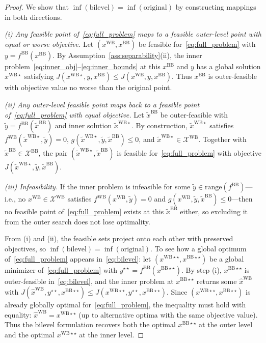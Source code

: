 \documentclass[12pt,a4paper]{article}%
\theoremstyle{plain}%
\theoremstyle{remark}%
\theoremstyle{definition}%
\def\WB{\mathrm{WB}}
\def\BB{\mathrm{BB}}
\begin{document}
\begin{appendices}
\begin{proof}
We show that $\inf(\text{bilevel}) = \inf(\text{original})$ by constructing mappings in both directions.

\emph{(i) Any feasible point of~\eqref{eq:full_problem} maps to a feasible outer-level point with equal or worse objective.}
Let $(x^{\WB}, x^{\BB})$ be feasible for~\eqref{eq:full_problem} with $y = f^{\BB}(x^{\BB})$. By Assumption~\ref{ass:separability}(ii), the inner problem~\eqref{eq:inner_obj}--\eqref{eq:inner_bounds} at this $x^{\BB}$ and $y$ has a global solution $x^{\WB\star}$ satisfying $J(x^{\WB\star}, y, x^{\BB}) \leq J(x^{\WB}, y, x^{\BB})$. Thus $x^{\BB}$ is outer-feasible with objective value no worse than the original point.

\emph{(ii) Any outer-level feasible point maps back to a feasible point of~\eqref{eq:full_problem} with equal objective.}
Let $\tilde{x}^{\BB}$ be outer-feasible with $\tilde{y} = f^{\BB}(\tilde{x}^{\BB})$ and inner solution $\tilde{x}^{\WB\star}$. By construction, $\tilde{x}^{\WB\star}$ satisfies $f^{\WB}(\tilde{x}^{\WB\star}, \tilde{y}) = 0$, $g(\tilde{x}^{\WB\star}, \tilde{y}, \tilde{x}^{\BB}) \leq 0$, and $\tilde{x}^{\WB\star} \in \mathcal{X}^{\WB}$. Together with $\tilde{x}^{\BB} \in \mathcal{X}^{\BB}$, the pair $(\tilde{x}^{\WB\star}, \tilde{x}^{\BB})$ is feasible for~\eqref{eq:full_problem} with objective $J(\tilde{x}^{\WB\star}, \tilde{y}, \tilde{x}^{\BB})$.

\emph{(iii) Infeasibility.}
If the inner problem is infeasible for some $\tilde{y} \in \text{range}(f^{\BB})$---i.e., no $x^{\WB} \in \mathcal{X}^{\WB}$ satisfies $f^{\WB}(x^{\WB}, \tilde{y}) = 0$ and $g(x^{\WB}, \tilde{y}, \tilde{x}^{\BB}) \leq 0$---then no feasible point of~\eqref{eq:full_problem} exists at this $\tilde{x}^{\BB}$ either, so excluding it from the outer search does not lose optimality.

From (i) and (ii), the feasible sets project onto each other with preserved objectives, so $\inf(\text{bilevel}) = \inf(\text{original})$. To see how a global optimum of~\eqref{eq:full_problem} appears in~\eqref{eq:bilevel}: let $(x^{\WB\star\star}, x^{\BB\star\star})$ be a global minimizer of~\eqref{eq:full_problem} with $y^{\star\star} = f^{\BB}(x^{\BB\star\star})$. By step (i), $x^{\BB\star\star}$ is outer-feasible in~\eqref{eq:bilevel}, and the inner problem at $x^{\BB\star\star}$ returns some $\hat{x}^{\WB}$ with $J(\hat{x}^{\WB}, y^{\star\star}, x^{\BB\star\star}) \leq J(x^{\WB\star\star}, y^{\star\star}, x^{\BB\star\star})$. Since $(x^{\WB\star\star}, x^{\BB\star\star})$ is already globally optimal for~\eqref{eq:full_problem}, the inequality must hold with equality: $\hat{x}^{\WB} = x^{\WB\star\star}$ (up to alternative optima with the same objective value). Thus the bilevel formulation recovers both the optimal $x^{\BB\star\star}$ at the outer level and the optimal $x^{\WB\star\star}$ at the inner level.


\end{proof}
\end{appendices}
\end{document}
